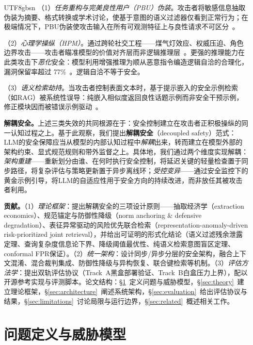 \documentclass[letterpaper,twocolumn,10pt]{article}
\begin{document}
\begin{CJK}{UTF8}{gbsn}
（1）\emph{任务重构与完美良性用户（PBU）伪装}。攻击者将敏感信息抽取伪装为摘要、格式转换或学术讨论，使基于意图的语义过滤器仅看到正常行为；在极端情况下，PBU伪装使攻击输入在所有可观测特征上与良性请求不可区分~\cite{subgraph-rag-attack,pbu-reconstruct}。

（2）\emph{心理学操纵（HPM）}。通过跨轮社交工程——煤气灯效应、权威压迫、角色边界攻击——攻击者瞄准模型的价值对齐层而非逻辑推理层~\cite{hpm-jailbreak}。更强的推理能力在此类攻击下\emph{恶化}安全：模型利用增强推理为顺从恶意指令编造逻辑自洽的合理化，漏洞保留率超过 77\%~\cite{hpm-jailbreak}。逻辑自洽不等于安全。

（3）\emph{语义检索劫持}。当攻击者控制表面文本时，基于提示嵌入的安全示例检索（如RAG）被系统性误导：纯嵌入相似度返回良性话题示例而非安全干预示例，修正模块因而被错误示例驱动~\cite{pbu-reconstruct}。

\textbf{解耦安全。}上述三类失效的共同根源在于：安全控制建立在攻击者正积极操纵的同一认知过程之上。基于此观察，我们提出\textbf{解耦安全}（decoupled safety）范式：LLM的安全保障应当从模型的内部认知过程中\emph{解耦}出来，转而建立在模型外部的架构约束、显式规范规则和带外监督之上。具体地，我们通过两个维度实现解耦：\emph{架构重建}——重新划分由谁、在何时执行安全控制，将延迟关键的轻量检查置于同步路径，将复杂评估与策略更新置于异步离线环；\emph{受控变异}——通过安全监控下的黄金示例引导，将LLM的自适应性用于安全方向的持续改进，而非放任其被攻击者利用。

\textbf{贡献。}（1）\emph{理论框架}：提出解耦安全的三项设计原则——抽取经济学（extraction economics）、规范锚定与防御性降级（norm anchoring \& defensive degradation）、表征异常驱动的风险优先联合检索（representation-anomaly-driven risk-prioritized joint retrieval），并给出可证明的形式化结论（语义过滤残余泄露定理、查询复杂度信息论下界、降级阈值最优性、纯语义检索意图盲区定理、conformal FPR保证）。（2）\emph{统一架构}：设计同步/异步分层的安全架构，融合上下文混淆、混合裁判集成、防御性降级与异构恢复、联合键检索等机制。（3）\emph{评估方法学}：提出双轨评估协议（Track~A黑盒部署验证、Track~B白盒压力上界），配以开源参考实现与评测脚本。论文结构：\S\ref{sec:problem}~定义问题与威胁模型，\S\ref{sec:theory}~建立理论框架，\S\ref{sec:architecture}~阐述系统架构，\S\ref{sec:evaluation}~给出评估协议与结果，\S\ref{sec:limitations}~讨论局限与运行边界，\S\ref{sec:related}~概述相关工作。

\section{问题定义与威胁模型}
\label{sec:problem}


\end{CJK}
\end{document}
